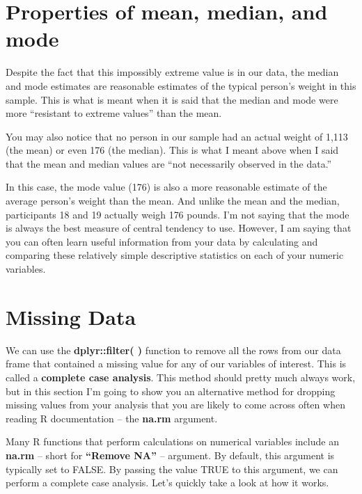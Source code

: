 \documentclass[
  letterpaper,
  DIV=11,
  numbers=noendperiod]{scrreprt}
\begin{document}
\section*{Properties of mean, median, and
mode}\label{properties-of-mean-median-and-mode}


Despite the fact that this impossibly extreme value is in our data, the
median and mode estimates are reasonable estimates of the typical
person's weight in this sample. This is what is meant when it is said
that the median and mode were more ``resistant to extreme values'' than
the mean.

You may also notice that no person in our sample had an actual weight of
1,113 (the mean) or even 176 (the median). This is what I meant above
when I said that the mean and median values are ``not necessarily
observed in the data.''

In this case, the mode value (176) is also a more reasonable estimate of
the average person's weight than the mean. And unlike the mean and the
median, participants 18 and 19 actually weigh 176 pounds. I'm not saying
that the mode is always the best measure of central tendency to use.
However, I am saying that you can often learn useful information from
your data by calculating and comparing these relatively simple
descriptive statistics on each of your numeric variables.

\section*{Missing Data}\label{missing-data}


We can use the \textbf{dplyr::filter( )} function to remove all the rows
from our data frame that contained a missing value for any of our
variables of interest. This is called a \textbf{complete case analysis}.
This method should pretty much always work, but in this section I'm
going to show you an alternative method for dropping missing values from
your analysis that you are likely to come across often when reading R
documentation -- the \textbf{na.rm} argument.

Many R functions that perform calculations on numerical variables
include an \textbf{na.rm} -- short for \textbf{``Remove NA''} --
argument. By default, this argument is typically set to FALSE. By
passing the value TRUE to this argument, we can perform a complete case
analysis. Let's quickly take a look at how it works.
\end{document}
